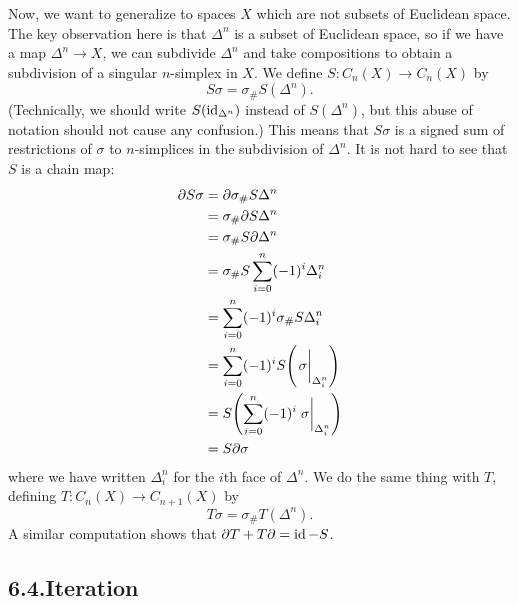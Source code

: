 \documentclass{article}
\begin{document}
\noindent{}Now, we want to generalize to spaces $X$ which are not subsets of Euclidean space. The key observation here is that $\Delta^n$ is a subset of Euclidean space, so if we have a map $\Delta^n \to X$, we can subdivide $\Delta^n$ and take compositions to obtain a subdivision of a singular $n$-simplex in $X$. We define $S: C_n(X) \to C_n(X)$ by%
\noindent\noindent\[%
S\sigma = \sigma_\# S(\Delta^n).
\]%
\noindent{}(Technically, we should write $S(\operatorname{id}_{\Delta^n})$ instead of $S(\Delta^n)$, but this abuse of notation should not cause any confusion.) This means that $S\sigma$ is a signed sum of restrictions of $\sigma$ to $n$-simplices in the subdivision of $\Delta^n$. It is not hard to see that $S$ is a chain map:
\noindent\noindent\[%
\begin{aligned}
\partial S \sigma &= \partial \sigma_\# S \Delta^n \\
&= \sigma_\# \partial S \Delta^n \\
&= \sigma_\# S \partial \Delta^n \\
&= \sigma_\# S \sum_{i=0}^n (-1)^i \Delta_i^n \\
&= \sum_{i=0}^n (-1)^i \sigma_\# S \Delta_i^n \\
&= \sum_{i=0}^n (-1)^i S\qty(\eval{\sigma}_{\Delta_i^n}) \\
&= S\qty(\sum_{i=0}^n (-1)^i \eval{\sigma}_{\Delta_i^n}) \\
&= S \partial \sigma
\end{aligned}
\]%
\noindent{}where we have written $\Delta_i^n$ for the $i$th face of $\Delta^n$. We do the same thing with $T$, defining $T: C_n(X) \to C_{n+1}(X)$ by
\noindent\noindent\[%
T\sigma = \sigma_\# T(\Delta^n).
\]%
\noindent{}A similar computation shows that $\partial T + T \partial = \operatorname{id} - S$.

\subsection{6.4.\hspace*{0.5em}Iteration}\label{sec-iteration}%
\end{document}
